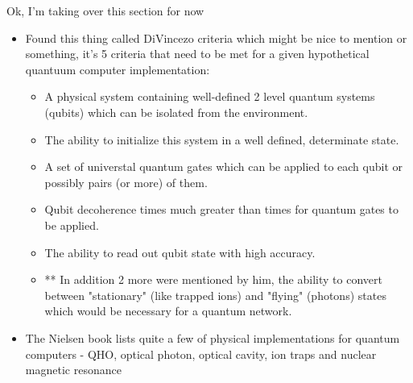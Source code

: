 Ok, I'm taking over this section for now
\begin{itemize}

\item
Found this thing called DiVincezo criteria which might be nice to mention or something, it's 5 criteria that need to be met for a given hypothetical quantuum computer implementation:
\begin{itemize}
    \item A physical system containing well-defined 2 level quantum systems (qubits) which can be isolated from the environment.
    \item The ability to initialize this system in a well defined, determinate state.
    \item A set of universtal quantum gates which can be applied to each qubit or possibly pairs (or more) of them.
    \item Qubit decoherence times much greater than times for quantum gates to be applied.
    \item The ability to read out qubit state with high accuracy.
    \item ** In addition 2 more were mentioned by him, the ability to convert between "stationary" (like trapped ions) and "flying" (photons) states which would be necessary for a quantum network.
\end{itemize}

\item
    The Nielsen book lists quite a few of physical implementations for quantum computers - QHO, optical photon, optical cavity, ion traps and nuclear magnetic resonance


\end{itemize}
